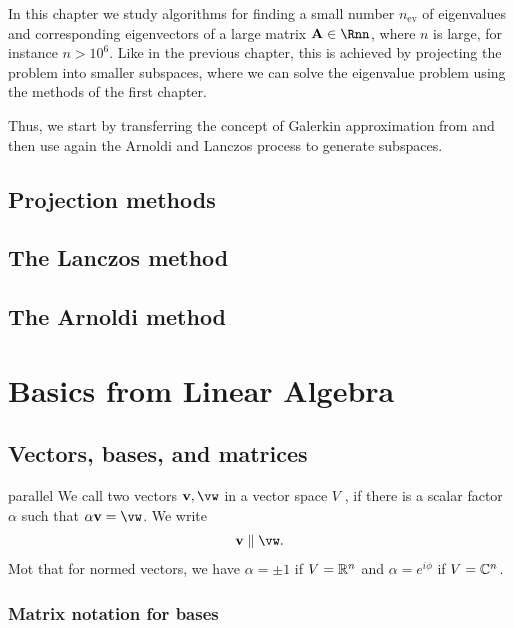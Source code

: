\begin{intro}
  In this chapter we study algorithms for finding a small number
  $n_{\text{ev}}$ of eigenvalues and corresponding eigenvectors of a
  large matrix $\mata\in\Rnn$, where $n$ is large, for instance
  $n>10^6$. Like in the previous chapter, this is achieved by
  projecting the problem into smaller subspaces, where we can solve
  the eigenvalue problem using the methods of the first chapter.

  Thus, we start by transferring the concept of Galerkin approximation
  from  and then use again the
  Arnoldi and Lanczos process to generate subspaces.
\end{intro}

\section{Projection methods}


\section{The Lanczos method}


\section{The Arnoldi method}



\appendix
\chapter{Basics from Linear Algebra}
\section{Vectors, bases, and matrices}

\begin{Definition}{parallel}
  We call two vectors $\vv,\vw$ in a vector space $V$ , if
  there is a scalar factor $\alpha$ such that $\alpha \vv=\vw$. We write
  \begin{gather}
    \vv\parallel\vw.
  \end{gather}
  Mot that for normed vectors, we have $\alpha = \pm1$ if $V=\mathbb R^n$ and
  $\alpha = e^{i\phi}$ if $V=\mathbb C^n$.
\end{Definition}

\subsection{Matrix notation for bases}

